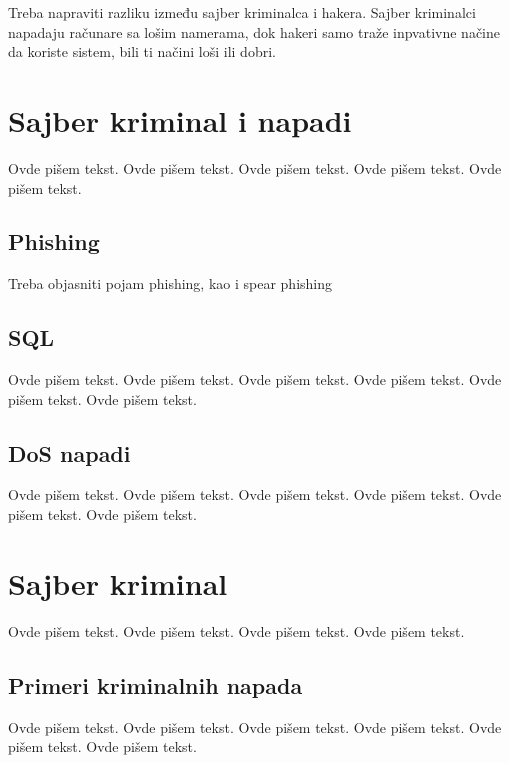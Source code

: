 \documentclass[a4paper]{article}
\begin{document}
Treba napraviti razliku između sajber kriminalca i hakera. Sajber kriminalci napadaju računare sa lošim namerama, dok hakeri samo traže inpvativne načine da koriste sistem, bili ti načini loši ili dobri.
\\

 

\section{Sajber kriminal i napadi}
\label{sec:kriminal_napadi}

Ovde pišem tekst. 
Ovde pišem tekst. 
Ovde pišem tekst. 
Ovde pišem tekst. 
Ovde pišem tekst. 

\subsection{Phishing}
\label{subsec:phishing}

Treba objasniti pojam phishing, kao i spear phishing

\subsection{SQL}
\label{subsec:sql}

Ovde pišem tekst. 
Ovde pišem tekst. 
Ovde pišem tekst. 
Ovde pišem tekst. 
Ovde pišem tekst. 
Ovde pišem tekst.

\subsection{DoS napadi}
\label{subsec:DoS}

Ovde pišem tekst. 
Ovde pišem tekst. 
Ovde pišem tekst. 
Ovde pišem tekst. 
Ovde pišem tekst. 
Ovde pišem tekst. 

\section{Sajber kriminal}
\label{sec:sajber_kriminal}

Ovde pišem tekst. 
Ovde pišem tekst. 
Ovde pišem tekst. 
Ovde pišem tekst. 

\subsection{Primeri kriminalnih napada}
\label{subsec:primeri_krimi_napada}

Ovde pišem tekst. 
Ovde pišem tekst. 
Ovde pišem tekst. 
Ovde pišem tekst. 
Ovde pišem tekst. 
Ovde pišem tekst. 
\end{document}
